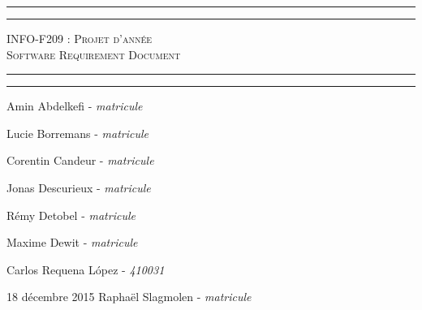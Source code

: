 \begin{titlepage}

\begin{center}
    \vspace*{\fill}
        \hrule
        \vspace*{2pt}
        \hrule
        \vspace*{15pt}
        \textsc{\Huge{INFO-F209 : Projet d'année \\\vspace*{8pt}
            Software Requirement Document}}
        \vspace*{15pt}
        \hrule
        \vspace*{2pt}
        \hrule
  \vspace*{\fill}
\end{center}
\null
\vfill

\hfill Amin Abdelkefi - \emph{matricule}

\hfill Lucie Borremans - \emph{matricule}

\hfill Corentin Candeur - \emph{matricule}

\hfill Jonas Descurieux - \emph{matricule}

\hfill Rémy Detobel - \emph{matricule}

\hfill Maxime Dewit - \emph{matricule}

\hfill Carlos Requena López - \emph{410031}

\large 18 décembre 2015 \hfill Raphaël Slagmolen - \emph{matricule}

\end{titlepage}